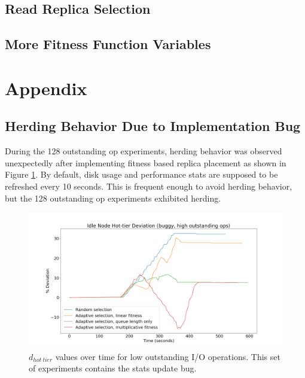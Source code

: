 \documentclass[12pt]{article}
\begin{document}
  \subsection{Read Replica Selection}



  \subsection{More Fitness Function Variables}



\section{Appendix}


  \subsection{Herding Behavior Due to Implementation Bug}

  During the 128 outstanding op experiments, herding behavior
  was observed unexpectedly after implementing fitness based replica placement
  as shown in Figure \ref{fig:herding_bug}. By default, disk usage and
  performance stats are supposed to be refreshed every 10 seconds. This is
  frequent enough to avoid herding behavior, but the 128 outstanding op
  experiments exhibited herding.

  \begin{figure}[h]
    \centering
    \includegraphics[scale=0.25]{images/buggy.png} 
    \caption{$d_{hot\ tier}$ values over time for low outstanding I/O
             operations. This set of experiments contains the stats update bug.}
    \label{fig:herding_bug}
  \end{figure}
\end{document}
